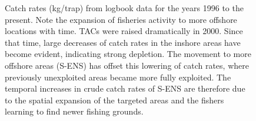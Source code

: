 \documentclass[11pt]{article}
\begin{document}
\begin{figure}[ht]
\begin{center}
\end{center}
\caption{Catch rates (kg/trap) from logbook data for the years 1996 to the present. Note the expansion of fisheries activity to more offshore locations with time. TACs were raised dramatically in 2000. Since that time, large decreases of catch rates in the inshore areas have become evident, indicating strong depletion. The movement to more offshore areas (S-ENS) has offset this lowering of catch rates, where previously unexploited areas became more fully exploited. The temporal increases in crude catch rates of S-ENS are therefore due to the spatial expansion of the targeted areas and the fishers learning to find newer fishing grounds.}
\label{maps.cpue}
\end{figure}
\end{document}
